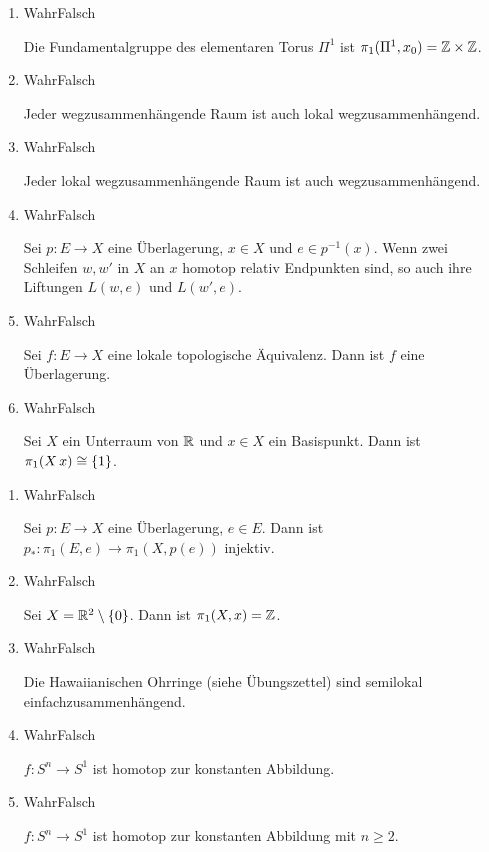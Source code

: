 \documentclass{../../../Template/TemplateExercise}
\newif\ifprintanswers
\newcommand*{\TrueFalse}[1]{%
\ifprintanswers
    \ifthenelse{\equal{#1}{W}}{%
        \textbf{WAHR}\hspace*{14pt}Falsch
    }{
        Wahr\hspace*{14pt}\textbf{FALSCH}
    }
\else
    {Wahr}\hspace*{14pt}Falsch 
\fi
}
\newlength\TFlengthA
\newlength\TFlengthB
\newcommand\TFQuestion[2]{%
    \setlength\TFlengthB{\linewidth}
    \addtolength\TFlengthB{-\TFlengthA}
    \parbox[t]{\TFlengthA}{\TrueFalse{#1}}\parbox[t]{\TFlengthB}{#2}}
\begin{document}
\begin{enumerate}
    \item \TFQuestion{W}{Die Fundamentalgruppe des elementaren Torus $\Pi^1$ ist $\pi_1(\Pi^1, x_0) = \mathbb{Z} \times \mathbb{Z}$.}
    \item \TFQuestion{F}{Jeder wegzusammenhängende Raum ist auch lokal wegzusammenhängend.}
    \item \TFQuestion{F}{Jeder lokal wegzusammenhängende Raum ist auch wegzusammenhängend.}
    \item \TFQuestion{W}{Sei $p: E \to X$ eine Überlagerung, $x \in X$ und $e \in p^{-1}(x)$. Wenn zwei Schleifen $w, w'$ in $X$ an $x$ homotop relativ Endpunkten sind, so auch ihre Liftungen $L(w, e)$ und $L(w', e)$.}
    \item \TFQuestion{F}{Sei $f: E \to X$ eine lokale topologische Äquivalenz. Dann ist $f$ eine Überlagerung.}
    \item \TFQuestion{W}{Sei $X$ ein Unterraum von $\mathbb{R}$ und $x \in X$ ein Basispunkt. Dann ist $\pi_1(X\, x) \cong \{1\}$.}
\end{enumerate}

\begin{enumerate}
    \item \TFQuestion{W}{Sei $p: E \to X$ eine Überlagerung, $e \in E$. Dann ist $p_*: \pi_1(E,e) \to \pi_1(X,p(e))$ injektiv.}
    \item \TFQuestion{W}{Sei $X=\mathbb{R}^2 \setminus \{0\}$. Dann ist $\pi_1(X,x)=\mathbb{Z}$.}
    \item \TFQuestion{F}{Die Hawaiianischen Ohrringe (siehe Übungszettel) sind semilokal einfachzusammenhängend.}
    \item \TFQuestion{F}{$f: S^n \to S^1$ ist homotop zur konstanten Abbildung.}
    \item \TFQuestion{W}{$f: S^n \to S^1$ ist homotop zur konstanten Abbildung mit $n \geq 2$.}
\end{enumerate}
\end{document}
